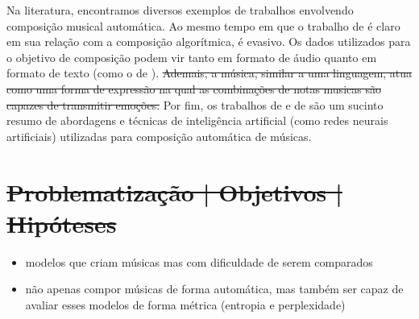 \documentclass{automatextcc}
\begin{document}
Na literatura, encontramos diversos exemplos de trabalhos envolvendo composição musical automática. Ao mesmo tempo em que o trabalho de \citet{colombo2016} é claro em sua relação com a composição algorítmica, \citet{souza2018} é evasivo. Os dados utilizados para o objetivo de composição podem vir tanto em formato de áudio \citep[como o de][]{kuang2021} quanto em formato de texto (como o de \citet{agarwala2017}). \sout{Ademais, a música, similar a uma linguagem, atua como uma forma de expressão na qual as combinações de notas musicas são capazes de transmitir emoções.} Por fim, os trabalhos de \citet{fernandez2013} e de \citet{olivan2021} são um sucinto resumo de abordagens e técnicas de inteligência artificial (como redes neurais artificiais) utilizadas para composição automática de músicas. 



\section{\sout{Problematização | Objetivos | Hipóteses } }
\begin{itemize}
    \item modelos que criam músicas mas com dificuldade de serem comparados
    \item não apenas compor músicas de forma automática, mas também ser capaz de avaliar esses modelos de forma métrica (entropia e perplexidade) 
\end{itemize}
\end{document}

